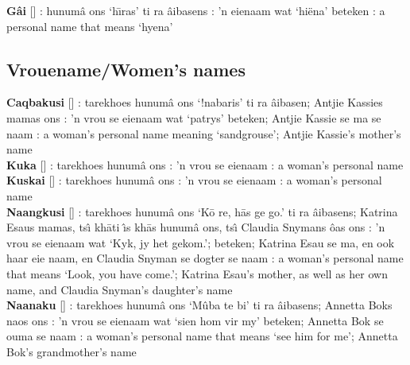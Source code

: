 \textbf{G\textdoublevertline{}\^{a}i}
[] :
\textdoublebarpipe{}hunum\^{a} \textvertline{}ons
`\textdoublebarpipe{}h\={\i}ras' ti ra
\textdoublebarpipe{}\^{a}ibasens : 'n eienaam wat
`hi\"{e}na' beteken : a personal name that means `hyena'



\markboth{}{}
\subsection*{Vrouename/Women's names}
\markboth{}{}

\textbf{Caqbakusi} [] :
tarekhoes \textdoublebarpipe{}hunum\^{a} \textvertline{}ons `!nabaris'
ti ra \textdoublebarpipe{}\^{a}ibasen; Antjie Kassies mamas
\textvertline{}ons : 'n vrou se eienaam wat `patrys'
beteken; Antjie Kassie se ma se naam : a woman's
personal name meaning `sandgrouse'; Antjie Kassie's mother's name \\

\textbf{Kuka} [] : tarekhoes
\textdoublebarpipe{}hunum\^{a} \textvertline{}ons : 'n
vrou se eienaam : a woman's personal name \\

\textbf{Kuskai} [] : tarekhoes
\textdoublebarpipe{}hunum\^{a} \textvertline{}ons : 'n
vrou se eienaam : a woman's personal name \\

\textbf{N\textvertline{}aangkusi}
[] : tarekhoes
\textdoublebarpipe{}hunum\^{a} \textvertline{}ons `K\={o} re, h\={a}s
ge go.' ti ra \textdoublebarpipe{}\^{a}ibasens; Katrina Esaus mamas,
ts\^{\i} \textdoublevertline{}kh\={a}ti \textdoublevertline{}\^{\i}s
\textvertline{}kh\={a}s \textdoublebarpipe{}hunum\^{a}
\textvertline{}ons, ts\^{\i} Claudia Snymans \^{o}as
\textvertline{}ons : 'n vrou se eienaam wat `Kyk, jy het
gekom.'; beteken; Katrina Esau se ma, en ook haar eie naam, en Claudia
Snyman se dogter se naam : a woman's personal name that
means `Look, you have come.'; Katrina Esau's mother, as well as her
own name, and Claudia Snyman's daughter's name \\

\textbf{N\textvertline{}aanaku}
[] : tarekhoes
\textdoublebarpipe{}hunum\^{a} \textvertline{}ons `M\^{u}ba te bi' ti
ra \textdoublebarpipe{}\^{a}ibasens; Annetta Boks
\textdoublevertline{}naos \textvertline{}ons : 'n vrou
se eienaam wat `sien hom vir my' beteken; Annetta Bok se ouma se naam
: a woman's personal name that means `see him for me';
Annetta Bok's grandmother's name \\

